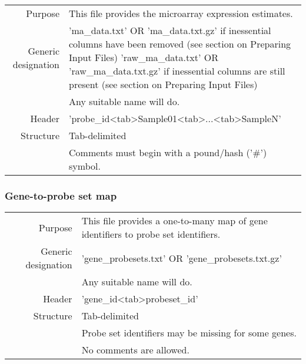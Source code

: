 \documentclass[a4paper,12pt]{article}
\begin{document}
\begin{tabular}{rp{12cm}}
Purpose & This file provides the microarray expression estimates. \\
Generic designation & 'ma\_data.txt' OR 'ma\_data.txt.gz' if inessential columns have been removed (see section on Preparing Input Files)
'raw\_ma\_data.txt' OR 'raw\_ma\_data.txt.gz' if inessential columns are still present (see section on Preparing Input Files) \\
  & Any suitable name will do. \\
Header & 'probe\_id\textless tab\textgreater Sample01\textless tab\textgreater...\textless tab\textgreater SampleN' \\
Structure & Tab-delimited \\
  & Comments must begin with a pound/hash ('\#') symbol. \\
\end{tabular}

\subsubsection{Gene-to-probe set map}
\label{gep:gene}

\begin{tabular}{rp{12cm}}
Purpose & This file provides a one-to-many map of gene identifiers to probe set identifiers. \\
Generic designation & 'gene\_probesets.txt' OR 'gene\_probesets.txt.gz' \\
  & Any suitable name will do. \\
Header & 'gene\_id\textless tab\textgreater probeset\_id' \\
Structure & Tab-delimited \\
  & Probe set identifiers may be missing for some genes. \\
  & No comments are allowed. \\
\end{tabular}
\end{document}
